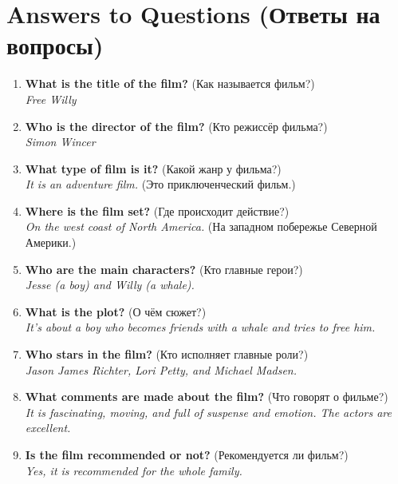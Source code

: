 \documentclass[12pt]{article}
\begin{document}
\section*{Answers to Questions (Ответы на вопросы)}

\begin{enumerate}
    \item \textbf{What is the title of the film?} (Как называется фильм?)\\
    \textit{Free Willy}

    \item \textbf{Who is the director of the film?} (Кто режиссёр фильма?)\\
    \textit{Simon Wincer}

    \item \textbf{What type of film is it?} (Какой жанр у фильма?)\\
    \textit{It is an adventure film.} (Это приключенческий фильм.)

    \item \textbf{Where is the film set?} (Где происходит действие?)\\
    \textit{On the west coast of North America.} (На западном побережье Северной Америки.)

    \item \textbf{Who are the main characters?} (Кто главные герои?)\\
    \textit{Jesse (a boy) and Willy (a whale).}

    \item \textbf{What is the plot?} (О чём сюжет?)\\
    \textit{It’s about a boy who becomes friends with a whale and tries to free him.}

    \item \textbf{Who stars in the film?} (Кто исполняет главные роли?)\\
    \textit{Jason James Richter, Lori Petty, and Michael Madsen.}

    \item \textbf{What comments are made about the film?} (Что говорят о фильме?)\\
    \textit{It is fascinating, moving, and full of suspense and emotion. The actors are excellent.}

    \item \textbf{Is the film recommended or not?} (Рекомендуется ли фильм?)\\
    \textit{Yes, it is recommended for the whole family.}
\end{enumerate}
\end{document}
